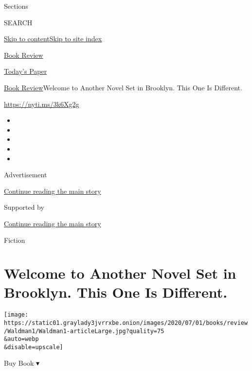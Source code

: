 Sections

SEARCH

\protect\hyperlink{site-content}{Skip to
content}\protect\hyperlink{site-index}{Skip to site index}

\href{https://www.nytimes3xbfgragh.onion/section/books/review}{Book
Review}

\href{https://myaccount.nytimes3xbfgragh.onion/auth/login?response_type=cookie\&client_id=vi}{}

\href{https://www.nytimes3xbfgragh.onion/section/todayspaper}{Today's
Paper}

\href{/section/books/review}{Book Review}\textbar{}Welcome to Another
Novel Set in Brooklyn. This One Is Different.

\url{https://nyti.ms/3k6Xg2g}

\begin{itemize}
\item
\item
\item
\item
\item
\end{itemize}

Advertisement

\protect\hyperlink{after-top}{Continue reading the main story}

Supported by

\protect\hyperlink{after-sponsor}{Continue reading the main story}

Fiction

\hypertarget{welcome-to-another-novel-set-in-brooklyn-this-one-is-different}{%
\section{Welcome to Another Novel Set in Brooklyn. This One Is
Different.}\label{welcome-to-another-novel-set-in-brooklyn-this-one-is-different}}

\texttt{[image: https://static01.graylady3jvrrxbe.onion/images/2020/07/01/books/review/Waldman1/Waldman1-articleLarge.jpg?quality=75\\\&auto=webp\\\&disable=upscale]}

Buy Book ▾

